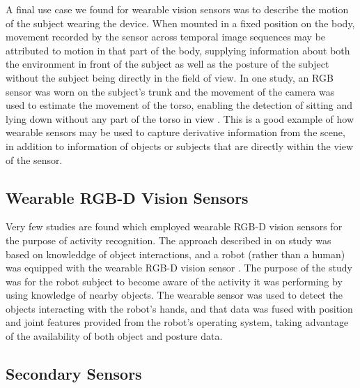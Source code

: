 \documentclass[12pt]{report}
\begin{document}
A final use case we found for wearable vision sensors was to describe the motion of the subject wearing the device. When mounted in a fixed position on the body, movement recorded by the sensor across temporal image sequences may be attributed to motion in that part of the body, supplying information about both the environment in front of the subject as well as the posture of the subject without the subject being directly in the field of view. In one study, an RGB sensor was worn on the subject’s trunk and the movement of the camera was used to estimate the movement of the torso, enabling the detection of sitting and lying down without any part of the torso in view \cite{Mahabalagiri2013}. This is a good example of how wearable sensors may be used to capture derivative information from the scene, in addition to information of objects or subjects that are directly within the view of the sensor.

\subsection{Wearable RGB-D Vision Sensors}

Very few studies are found which employed wearable RGB-D vision sensors for the purpose of activity recognition. The approach described in on study was based on knowleddge of object interactions, and a robot (rather than a human) was equipped with the wearable RGB-D vision sensor \cite{Li2016}. The purpose of the study was for the robot subject to become aware of the activity it was performing by using knowledge of nearby objects. The wearable sensor was used to detect the objects interacting with the robot’s hands, and that data was fused with position and joint features provided from the robot’s operating system, taking advantage of the availability of both object and posture data. 

\subsection{Secondary Sensors}
\end{document}
